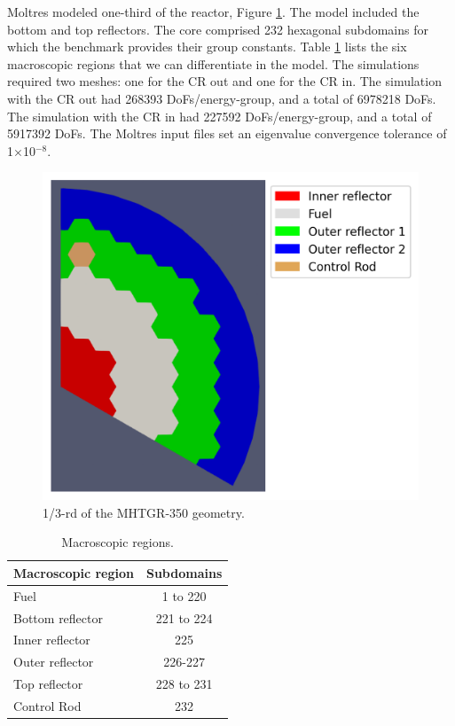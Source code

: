 Moltres modeled one-third of the reactor, Figure \ref{fig:bench-mesh}.
The model included the bottom and top reflectors.
The core comprised 232 hexagonal subdomains for which the benchmark provides their group constants.
Table \ref{tab:mac-region} lists the six macroscopic regions that we can differentiate in the model.
The simulations required two meshes: one for the CR out and one for the CR in.
The simulation with the CR out had 268393 \glspl{DoF}/energy-group, and a total of 6978218 DoFs.
The simulation with the CR in had 227592 \glspl{DoF}/energy-group, and a total of 5917392 DoFs.
The Moltres input files set an eigenvalue convergence tolerance of 1$\times$10$^{-8}$.

\begin{figure}[htbp!]
	\centering
	\includegraphics[width=0.55\linewidth]{figures-neutronics/oecd-fullcore-legend}
	\hfill
	\caption{1/3-rd of the MHTGR-350 geometry.}
	\label{fig:bench-mesh}
\end{figure}

\begin{table}[htbp!]
  \centering
  \caption{Macroscopic regions.}
  \label{tab:mac-region}
  \begin{tabular}{@{}l c}
  \toprule
  Macroscopic region    & Subdomains     \\
  \midrule
  Fuel              & 1 to 220      \\
  Bottom reflector  & 221 to 224    \\
  Inner reflector   & 225           \\
  Outer reflector   & 226-227       \\
  Top reflector     & 228 to 231    \\
  Control Rod       & 232           \\
  \bottomrule
  \end{tabular}
\end{table}

